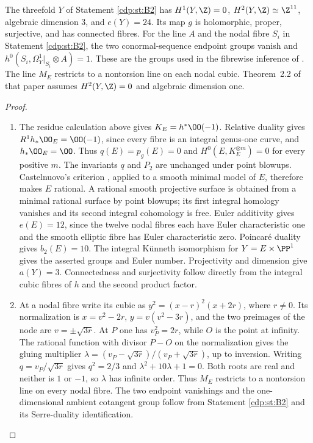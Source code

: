 \begin{proposition}\hypertarget{tag-01BM}{}\label{cdp:st:B3}

The threefold $Y$ of Statement \ref{cdp:st:B2} has $H^1(Y,\Z)=0$, $H^2(Y,\Z)\simeq\Z^{11}$, algebraic dimension $3$, and $e(Y)=24$. Its map $g$ is holomorphic, proper, surjective, and has connected fibres. For the line $A$ and the nodal fibre $S_i$ in Statement \ref{cdp:st:B2}, the two conormal-sequence endpoint groups vanish and $h^0(S_i,\Omega_Y^1|_{S_i}\otimes A)=1$. These are the groups used in the fibrewise inference of \cite[Section~7]{CDP20}. The line $M_E$ restricts to a nontorsion line on each nodal cubic. Theorem~2.2 of that paper assumes $H^2(Y,\Z)=0$ and algebraic dimension one.
\end{proposition}


\begin{proof}
\begin{enumerate}[label=\arabic*.,leftmargin=*]
\item 
The residue calculation above gives $K_E=h^*\OO(-1)$. Relative duality gives $R^1h_*\OO_E=\OO(-1)$, since every fibre is an integral genus-one curve, and $h_*\OO_E=\OO$. Thus $q(E)=p_g(E)=0$ and $H^0(E,K_E^{\otimes m})=0$ for every positive $m$. The invariants $q$ and $P_2$ are unchanged under point blowups. Castelnuovo's criterion \cite[Theorem~2.26, p.~178]{Hassett2009Rational}, applied to a smooth minimal model of $E$, therefore makes $E$ rational. A rational smooth projective surface is obtained from a minimal rational surface by point blowups; its first integral homology vanishes and its second integral cohomology is free. Euler additivity gives $e(E)=12$, since the twelve nodal fibres each have Euler characteristic one and the smooth elliptic fibre has Euler characteristic zero. Poincar\'e duality gives $b_2(E)=10$. The integral K\"unneth isomorphism for $Y=E\times\PP^1$ gives the asserted groups and Euler number. Projectivity and dimension give $a(Y)=3$. Connectedness and surjectivity follow directly from the integral cubic fibres of $h$ and the second product factor.

\item At a nodal fibre write its cubic as $y^2=(x-r)^2(x+2r)$, where $r\ne0$. Its normalization is $x=v^2-2r$, $y=v(v^2-3r)$, and the two preimages of the node are $v=\pm\sqrt{3r}$. At $P$ one has $v_P^2=2r$, while $O$ is the point at infinity. The rational function with divisor $P-O$ on the normalization gives the gluing multiplier $\lambda=(v_P-\sqrt{3r})/(v_P+\sqrt{3r})$, up to inversion. Writing $q=v_P/\sqrt{3r}$ gives $q^2=2/3$ and $\lambda^2+10\lambda+1=0$. Both roots are real and neither is $1$ or $-1$, so $\lambda$ has infinite order. Thus $M_E$ restricts to a nontorsion line on every nodal fibre. The two endpoint vanishings and the one-dimensional ambient cotangent group follow from Statement \ref{cdp:st:B2} and its Serre-duality identification.

\end{enumerate}
\end{proof}